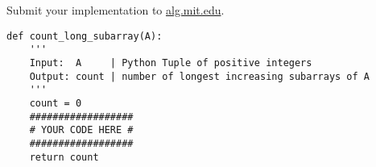\documentclass[12pt,twoside]{article}
\begin{document}

\begin{problems}

\problem  %

\begin{problemparts}
\problempart %
\problempart %
\problempart %
\end{problemparts}

\problem  %

\begin{problemparts}
\problempart %
\problempart %
\problempart %
\end{problemparts}

\problem  %

\begin{problemparts}
\problempart %
\problempart %
\problempart %
\end{problemparts}

\problem  %

\newpage
\problem  %

\vfill
\problem  %
Submit your implementation to {\small\url{alg.mit.edu}}.

\begin{lstlisting}
def count_long_subarray(A):
    '''
    Input:  A     | Python Tuple of positive integers
    Output: count | number of longest increasing subarrays of A
    '''
    count = 0
    ##################
    # YOUR CODE HERE #
    ##################
    return count
\end{lstlisting}

\end{problems}
\end{document}

